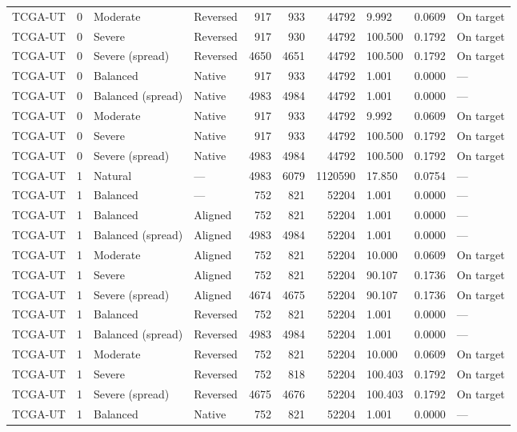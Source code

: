 \begin{longtable}{lrllrrrlll}
TCGA-UT & 0 & Moderate & Reversed & 917 & 933 & 44792 & 9.992 & 0.0609 & On target \\
TCGA-UT & 0 & Severe & Reversed & 917 & 930 & 44792 & 100.500 & 0.1792 & On target \\
TCGA-UT & 0 & Severe (spread) & Reversed & 4650 & 4651 & 44792 & 100.500 & 0.1792 & On target \\
TCGA-UT & 0 & Balanced & Native & 917 & 933 & 44792 & 1.001 & 0.0000 & --- \\
TCGA-UT & 0 & Balanced (spread) & Native & 4983 & 4984 & 44792 & 1.001 & 0.0000 & --- \\
TCGA-UT & 0 & Moderate & Native & 917 & 933 & 44792 & 9.992 & 0.0609 & On target \\
TCGA-UT & 0 & Severe & Native & 917 & 933 & 44792 & 100.500 & 0.1792 & On target \\
TCGA-UT & 0 & Severe (spread) & Native & 4983 & 4984 & 44792 & 100.500 & 0.1792 & On target \\
TCGA-UT & 1 & Natural & --- & 4983 & 6079 & 1120590 & 17.850 & 0.0754 & --- \\
TCGA-UT & 1 & Balanced & --- & 752 & 821 & 52204 & 1.001 & 0.0000 & --- \\
TCGA-UT & 1 & Balanced & Aligned & 752 & 821 & 52204 & 1.001 & 0.0000 & --- \\
TCGA-UT & 1 & Balanced (spread) & Aligned & 4983 & 4984 & 52204 & 1.001 & 0.0000 & --- \\
TCGA-UT & 1 & Moderate & Aligned & 752 & 821 & 52204 & 10.000 & 0.0609 & On target \\
TCGA-UT & 1 & Severe & Aligned & 752 & 821 & 52204 & 90.107 & 0.1736 & On target \\
TCGA-UT & 1 & Severe (spread) & Aligned & 4674 & 4675 & 52204 & 90.107 & 0.1736 & On target \\
TCGA-UT & 1 & Balanced & Reversed & 752 & 821 & 52204 & 1.001 & 0.0000 & --- \\
TCGA-UT & 1 & Balanced (spread) & Reversed & 4983 & 4984 & 52204 & 1.001 & 0.0000 & --- \\
TCGA-UT & 1 & Moderate & Reversed & 752 & 821 & 52204 & 10.000 & 0.0609 & On target \\
TCGA-UT & 1 & Severe & Reversed & 752 & 818 & 52204 & 100.403 & 0.1792 & On target \\
TCGA-UT & 1 & Severe (spread) & Reversed & 4675 & 4676 & 52204 & 100.403 & 0.1792 & On target \\
TCGA-UT & 1 & Balanced & Native & 752 & 821 & 52204 & 1.001 & 0.0000 & --- \\

\end{longtable}
